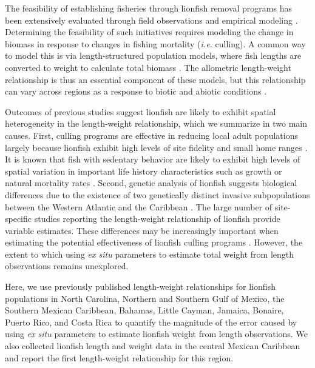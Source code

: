 \documentclass[fleqn,10pt,lineno]{wlpeerj} %
\begin{document}
The feasibility of establishing fisheries through lionfish removal
programs has been extensively evaluated through field observations and
empirical modeling
\citep{barbour_2011,morris_2011,deleon_2013,johnston_2015,sandel_2015,usseglio_2017}.
Determining the feasibility of such initiatives requires modeling the
change in biomass in response to changes in fishing mortality
(\emph{i.e.} culling). A common way to model this is via
length-structured population models, where fish lengths are converted to
weight to calculate total biomass
\citep{barbour_2011,cote_2014,andradibrown_2017}. The allometric
length-weight relationship is thus an essential component of these
models, but this relationship can vary across regions as a response to
biotic and abiotic conditions \citep{johnson_2016}.

Outcomes of previous studies suggest lionfish are likely to exhibit
spatial heterogeneity in the length-weight relationship, which we
summarize in two main causes. First, culling programs are effective in
reducing local adult populations largely because lionfish exhibit high
levels of site fidelity and small home ranges
\citep{Fishelson_1997,kochzius_2005,jud_2012,cote_2014}. It is known
that fish with sedentary behavior are likely to exhibit high levels of
spatial variation in important life history characteristics such as
growth or natural mortality rates
\citep{gunderson_2008,hutchinson_2008,wilson_2012,guan_2013}. Second,
genetic analysis of lionfish suggests biological differences due to the
existence of two genetically distinct invasive subpopulations between
the Western Atlantic and the Caribbean \citep{betancurr_2011}. The large
number of site-specific studies reporting the length-weight relationship
of lionfish provide variable estimates. These differences may be
increasingly important when estimating the potential effectiveness of
lionfish culling programs
\citep{barbour_2011,morris_2011,cote_2014,johnston_2015}. However, the
extent to which using \emph{ex situ} parameters to estimate total weight
from length observations remains unexplored.

Here, we use previously published length-weight relationships for
lionfish populations in North Carolina, Northern and Southern Gulf of
Mexico, the Southern Mexican Caribbean, Bahamas, Little Cayman, Jamaica,
Bonaire, Puerto Rico, and Costa Rica to quantify the magnitude of the
error caused by using \emph{ex situ} parameters to estimate lionfish
weight from length observations. We also collected lionfish length and
weight data in the central Mexican Caribbean and report the first
length-weight relationship for this region.
\end{document}
